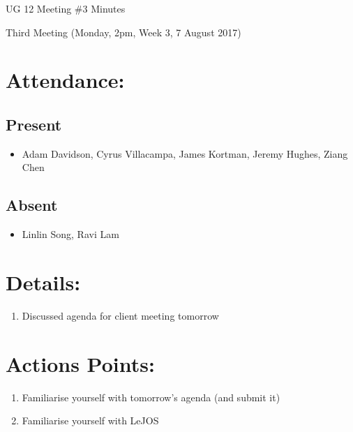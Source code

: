 \documentclass{article}
\begin{document}
\begin{adjustwidth}{2.5em}{0pt}
\begin{center}
\Large{UG 12 Meeting \#3 Minutes}\\
\end{center}
\end{adjustwidth}


Third Meeting (Monday, 2pm, Week 3, 7 August 2017)
\section{Attendance:}
\subsection*{Present}
\begin{itemize}
\item Adam Davidson, Cyrus Villacampa, James Kortman, Jeremy Hughes, Ziang Chen
\end{itemize}
\subsection*{Absent}
\begin{itemize}
\item Linlin Song, Ravi Lam
\end {itemize}

\section{Details:}
\begin{enumerate}
\item Discussed agenda for client meeting tomorrow
\end{enumerate}

\section{Actions Points:}
\begin{enumerate}
\item Familiarise yourself with tomorrow's agenda (and submit it) 
\item Familiarise yourself with LeJOS
\end{enumerate}
\end{document}
